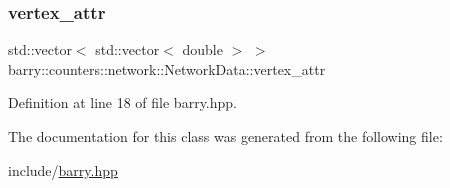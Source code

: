 \subsubsection{\texorpdfstring{vertex\+\_\+attr}{vertex\_attr}}
{\footnotesize\ttfamily std\+::vector$<$ std\+::vector$<$ double $>$ $>$ barry\+::counters\+::network\+::\+Network\+Data\+::vertex\+\_\+attr}



Definition at line 18 of file barry.\+hpp.



The documentation for this class was generated from the following file\+:\begin{DoxyCompactItemize}
\item 
include/\hyperlink{barry_8hpp}{barry.\+hpp}\end{DoxyCompactItemize}

